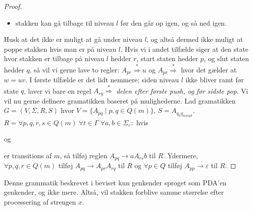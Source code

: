 \begin{proof}
\begin{itemize}
    \item stakken kan gå tilbage til niveau $l$ før den går op igen, og så ned igen.
  \end{itemize}
  Husk at det ikke er muligt at gå under niveau $l$, og altså dermed ikke muligt at poppe stakken hvis man er på niveau $l$. Hvis vi i andet tilfælde siger at den state hvor stakken er tilbage på niveau $l$ hedder $r$, start staten hedder $p$, og slut staten hedder $q$, så vil vi gerne lave to regler: $A_{pr} \stackrel{*}{\Rightarrow} u$ og $A_{pr} \stackrel{*}{\Rightarrow}$ hvor det gælder at $w = uv$. I første tilfælde er det lidt nemmere; siden niveau $l$ ikke bliver ramt før state $q$, laver vi bare en regel $A_{rq} \stackrel{*}{\Rightarrow}$ \textit{delen efter første push, og før sidste pop}.
  Vi vil nu gerne definere gramatikken baseret på mulighederne. Lad gramatikken $G = (V, \Sigma, R, S)$ hvor $V = \{A_{pq} \; |\; p,q \in Q(m)\}$, $S = A_{q_0q_{accept}}$. $R = \forall p,q,r,s \in Q(m)\; \forall t \in \Gamma \; \forall a, b \in \Sigma_\varepsilon :$
  hvis

  \begin{center}

  \end{center}
og
\begin{center}

\end{center}
  er transitions af $m$, så tilføj reglen $A_{pq} \rightarrow aA_{rs}b$ til $R$. Ydermere, $\forall p,q,r \in Q(m)$ tilføj $A_{pq} \rightarrow A_{pr}A_{rq}$ til $R$ og $\forall p \in Q$ tilføj $A_{pp} \rightarrow \varepsilon$ til $R$.
\end{proof}

\begin{claim}
Denne grammatik beskrevet i beviset kun genkender sproget som PDA'en genkender, og ikke mere. Altså, vil stakken forblive samme størrelse efter processering af strengen $x$.
\end{claim}

